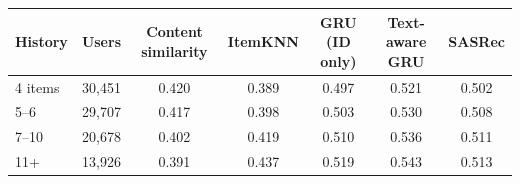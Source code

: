 \begin{tabular}{lrccccc}
\toprule
History & Users & Content similarity & ItemKNN & GRU (ID only) & Text-aware GRU & SASRec \\
\midrule
4 items & 30{,}451 & 0.420 & 0.389 & 0.497 & 0.521 & 0.502 \\
5--6 & 29{,}707 & 0.417 & 0.398 & 0.503 & 0.530 & 0.508 \\
7--10 & 20{,}678 & 0.402 & 0.419 & 0.510 & 0.536 & 0.511 \\
11+ & 13{,}926 & 0.391 & 0.437 & 0.519 & 0.543 & 0.513 \\
\bottomrule
\end{tabular}

